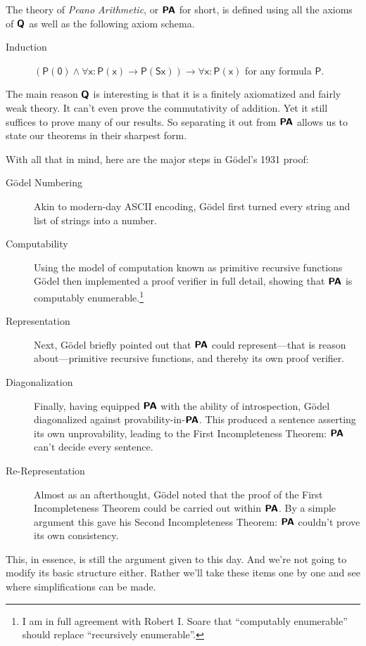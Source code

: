 \documentclass{article}
\theoremstyle{customstyle}
\newcommand{\fm}[1]{\mathsf{#1}}
\newcommand{\Q}{\textbf{\textsf{Q}}}
\newcommand{\PA}{\textbf{\textsf{PA}}}
\begin{document}
\begin{definition}
  The theory of \emph{Peano Arithmetic}, or $\PA$ for short, is defined using all the axioms of $\Q$ as well as the following axiom schema.
  \begin{description}
    \item[Induction]
          $(\fm{P}(\fm{0}) \land \forall \fm{x} \colon \fm{P}(\fm{x}) \rightarrow \fm{P}(\fm{S}\fm{x})) \rightarrow \forall \fm{x} \colon \fm{P}(\fm{x})$ for any formula $\fm{P}$.
  \end{description}
\end{definition}
The main reason $\Q$ is interesting is that it is a finitely axiomatized and fairly weak theory. It can't even prove the commutativity of addition. Yet it still suffices to prove many of our results. So separating it out from $\PA$ allows us to state our theorems in their sharpest form.

With all that in mind, here are the major steps in Gödel's 1931 proof:
\begin{description}
  \item[Gödel Numbering]
        Akin to modern-day ASCII encoding, Gödel first turned every string and list of strings into a number.
  \item[Computability]
        Using the model of computation known as primitive recursive functions Gödel then implemented a proof verifier in full detail, showing that $\PA$ is computably enumerable.\footnote{I am in full agreement with Robert I. Soare \cite{soare} that ``computably enumerable'' should replace ``recursively enumerable''.}
  \item[Representation]
        Next, Gödel briefly pointed out that $\PA$ could represent---that is reason about---primitive recursive functions, and thereby its own proof verifier.
  \item[Diagonalization]
        Finally, having equipped $\PA$ with the ability of introspection, Gödel diagonalized against provability-in-$\PA$. This produced a sentence asserting its own unprovability, leading to the First Incompleteness Theorem: $\PA$ can't decide every sentence.
  \item[Re-Representation]
        Almost as an afterthought, Gödel noted that the proof of the First Incompleteness Theorem could be carried out within $\PA$. By a simple argument this gave his Second Incompleteness Theorem: $\PA$ couldn't prove its own consistency.
\end{description}
This, in essence, is still the argument given to this day. And we're not going to modify its basic structure either. Rather we'll take these items one by one and see where simplifications can be made.
\end{document}
